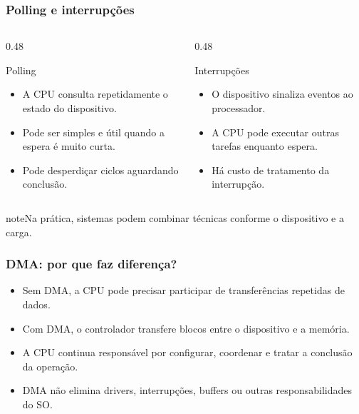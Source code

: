 \documentclass[aspectratio=169,11pt]{beamer}
\begin{document}
\begin{frame}
\frametitle{Polling e interrupções}
\begin{columns}[T,onlytextwidth]
\begin{column}{0.48\textwidth}
\begin{block}{Polling}\small\begin{itemize}
\item A CPU consulta repetidamente o estado do dispositivo.
\item Pode ser simples e útil quando a espera é muito curta.
\item Pode desperdiçar ciclos aguardando conclusão.
\end{itemize}\end{block}\end{column}
\begin{column}{0.48\textwidth}
\begin{block}{Interrupções}\small\begin{itemize}
\item O dispositivo sinaliza eventos ao processador.
\item A CPU pode executar outras tarefas enquanto espera.
\item Há custo de tratamento da interrupção.
\end{itemize}\end{block}\end{column}\end{columns}
\vfill\begin{beamercolorbox}[wd=\textwidth,sep=2mm,rounded=true]{note}\small Na prática, sistemas podem combinar técnicas conforme o dispositivo e a carga.\end{beamercolorbox}

\end{frame}

\begin{frame}
\frametitle{DMA: por que faz diferença?}
\large
\begin{itemize}
\item Sem DMA, a CPU pode precisar participar de transferências repetidas de dados.
\item Com DMA, o controlador transfere blocos entre o dispositivo e a memória.
\item A CPU continua responsável por configurar, coordenar e tratar a conclusão da operação.
\item DMA não elimina drivers, interrupções, buffers ou outras responsabilidades do SO.
\end{itemize}

\end{frame}
\end{document}
